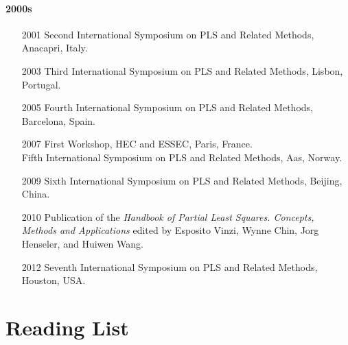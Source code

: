 \documentclass[12pt]{book}\usepackage{graphicx, color}
\begin{document}
\paragraph{2000s}
\begin{enumerate}
\item[2001] Second International Symposium on PLS and Related Methods, Anacapri, Italy.
 \item[2003] Third International Symposium on PLS and Related Methods, Lisbon, Portugal.
 \item[2005] Fourth International Symposium on PLS and Related Methods, Barcelona, Spain.
 \item[2007] First Workshop, HEC and ESSEC, Paris, France. \\
 Fifth International Symposium on PLS and Related Methods, Aas, Norway.
 \item[2009] Sixth International Symposium on PLS and Related Methods, Beijing, China.
 \item[2010] Publication of the \textit{Handbook of Partial Least Squares. Concepts, Methods and Applications} edited by Esposito Vinzi, Wynne Chin, Jorg Henseler, and Huiwen Wang.
 \item[2012] Seventh International Symposium on PLS and Related Methods, Houston, USA.
\end{enumerate}




\section{Reading List}
\end{document}
